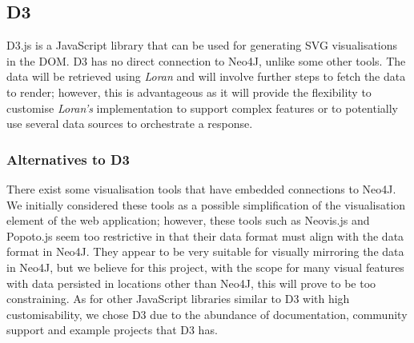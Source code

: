 \subsection{D3}
D3.js is a JavaScript library that can be used for generating SVG visualisations in the DOM. D3 has no direct connection to Neo4J, unlike some other tools. The data will be retrieved using \textit{Loran} and will involve further steps to fetch the data to render; however, this is advantageous as it will provide the flexibility to customise \textit{Loran's} implementation to support complex features or to potentially use several data sources to orchestrate a response. 

\subsubsection{Alternatives to D3}
There exist some visualisation tools that have embedded connections to Neo4J. We initially considered these tools as a possible simplification of the visualisation element of the web application; however, these tools such as Neovis.js and Popoto.js seem too restrictive in that their data format must align with the data format in Neo4J. They appear to be very suitable for visually mirroring the data in Neo4J, but we believe for this project, with the scope for many visual features with data persisted in locations other than Neo4J, this will prove to be too constraining. As for other JavaScript libraries similar to D3 with high customisability, we chose D3 due to the abundance of documentation, community support and example projects that D3 has. 

